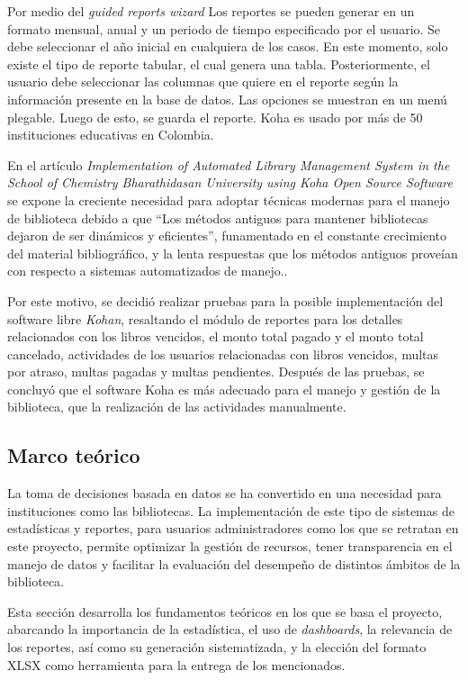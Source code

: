 \documentclass[spanish]{ieee_upb}
\begin{document}
Por medio del \textit{guided reports wizard} Los reportes se pueden generar en un formato mensual, anual y un periodo de tiempo especificado por el usuario. Se debe seleccionar el año inicial en cualquiera de los casos. En este momento, solo existe el tipo de reporte tabular, el cual genera una tabla. Posteriormente, el usuario debe seleccionar las columnas que quiere en el reporte según la información presente en la base de datos. Las opciones se muestran en un menú plegable. Luego de esto, se guarda el reporte. Koha es usado por más de 50 instituciones educativas en Colombia\cite{kohaDatosColombia}.

En el artículo \textit{Implementation of Automated Library Management System in the School
of Chemistry Bharathidasan University using Koha Open Source Software}\cite{colegioKoha} se expone la creciente necesidad para adoptar técnicas modernas para el manejo de biblioteca debido a que “Los métodos antiguos para mantener bibliotecas dejaron de ser dinámicos y eficientes'', funamentado en el constante crecimiento del material bibliográfico, y la lenta respuestas que los métodos antiguos proveían con respecto a sistemas automatizados de manejo.\cite{colegioKoha}. 

Por este motivo, se decidió realizar pruebas para la posible implementación del software libre \textit{Kohan}, resaltando el módulo de reportes para los detalles relacionados con los libros vencidos, el monto total pagado y el monto total cancelado, actividades de los usuarios relacionadas con libros vencidos, multas por atraso, multas pagadas y multas pendientes. Después de las pruebas, se concluyó que el software Koha es más adecuado para el manejo y gestión de la biblioteca, que la realización de las actividades manualmente.

\subsection{Marco teórico}
La toma de decisiones basada en datos se ha convertido en una necesidad para instituciones como las bibliotecas. La implementación de este tipo de sistemas de estadísticas y reportes, para usuarios administradores como los que se retratan en este proyecto, permite optimizar la gestión de recursos, tener transparencia en el manejo de datos y facilitar la evaluación del desempeño de distintos ámbitos de la biblioteca. 

\vspace{0.3cm}
Esta sección desarrolla los fundamentos teóricos en los que se basa el proyecto, abarcando la importancia de la estadística, el uso de \textit{dashboards}, la relevancia de los reportes, así como su generación sistematizada, y la elección del formato XLSX como herramienta para la entrega de los mencionados.
\end{document}
